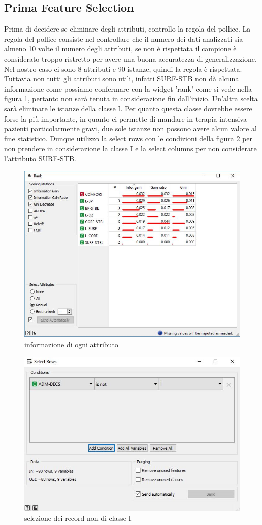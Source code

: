 \documentclass[a4paper, 12p]{report}
\begin{document}
\subsection{Prima Feature Selection}
Prima di decidere se eliminare degli attributi, controllo la regola del pollice. La regola del pollice consiste nel controllare che il numero dei dati analizzati sia almeno 10 volte il numero degli attributi, se non è rispettata il campione è considerato troppo ristretto per avere una buona accuratezza di generalizzazione. Nel nostro caso ci sono 8 attributi e 90 istanze, quindi la regola è rispettata.
Tuttavia non tutti gli attributi sono utili, infatti SURF-STB non dà alcuna informazione come possiamo confermare con la widget 'rank' come si vede nella figura \ref{fig:1}, pertanto non sarà tenuta in considerazione fin dall'inizio.
Un'altra scelta sarà eliminare le istanze della classe I. Per quanto questa classe dovrebbe essere forse la più importante, in quanto ci permette di mandare in terapia intensiva pazienti particolarmente gravi, due sole istanze non possono avere alcun valore al fine statistico. 
Dunque utilizzo la select rows con le condizioni della figura \ref{fig:2} per non prendere in considerazione la classe I e la select columns per non considerare l'attributo SURF-STB.
\begin{figure}	
	\centering
	\includegraphics[scale = 0.5]{img/rank.JPG}
	\caption{informazione di ogni attributo }\label{fig:1}
\end{figure}
\begin{figure}
	\centering
	\includegraphics[scale = 0.5]{img/rows.JPG}
	\caption{selezione dei record non di classe I}	\label{fig:2}
\end{figure}	
\end{document}
